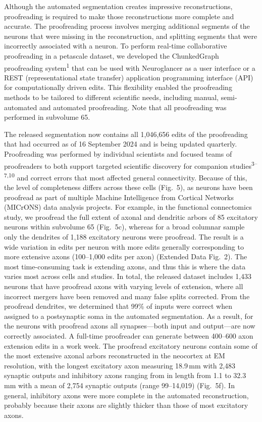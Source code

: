 \documentclass{article}
\begin{document}
Although the automated segmentation creates impressive reconstructions, proofreading is required to make those reconstructions more complete and accurate. The proofreading process involves merging additional segments of the neurons that were missing in the reconstruction, and splitting segments that were incorrectly associated with a neuron. To perform real-time collaborative proofreading in a petascale dataset, we developed the ChunkedGraph proofreading system\textsuperscript{1} that can be used with Neuroglancer as a user interface or a REST (representational state transfer) application programming interface (API) for computationally driven edits. This flexibility enabled the proofreading methods to be tailored to different scientific needs, including manual, semi-automated and automated proofreading. Note that all proofreading was performed in subvolume 65.

The released segmentation now contains all 1,046,656 edits of the proofreading that had occurred as of 16 September 2024 and is being updated quarterly. Proofreading was performed by individual scientists and focused teams of proofreaders to both support targeted scientific discovery for companion studies\textsuperscript{3–7,10} and correct errors that most affected general connectivity. Because of this, the level of completeness differs across these cells (Fig.~5), as neurons have been proofread as part of multiple Machine Intelligence from Cortical Networks (MICrONS) data analysis projects. For example, in the functional connectomics study, we proofread the full extent of axonal and dendritic arbors of 85 excitatory neurons within subvolume 65 (Fig.~5c), whereas for a broad columnar sample only the dendrites of 1,188 excitatory neurons were proofread. The result is a wide variation in edits per neuron with more edits generally corresponding to more extensive axons (100–1,000 edits per axon) (Extended Data Fig.~2). The most time-consuming task is extending axons, and thus this is where the data varies most across cells and studies. In total, the released dataset includes 1,433 neurons that have proofread axons with varying levels of extension, where all incorrect mergers have been removed and many false splits corrected. From the proofread dendrites, we determined that 99\% of inputs were correct when assigned to a postsynaptic soma in the automated segmentation. As a result, for the neurons with proofread axons all synapses—both input and output—are now correctly associated. A full-time proofreader can generate between 400–600 axon extension edits in a work week. The proofread excitatory neurons contain some of the most extensive axonal arbors reconstructed in the neocortex at EM resolution, with the longest excitatory axon measuring 18.9\,mm with 2,483 synaptic outputs and inhibitory axons ranging from in length from 1.1 to 32.3\,mm with a mean of 2,754 synaptic outputs (range 99–14,019) (Fig.~5f). In general, inhibitory axons were more complete in the automated reconstruction, probably because their axons are slightly thicker than those of most excitatory axons.
\end{document}
